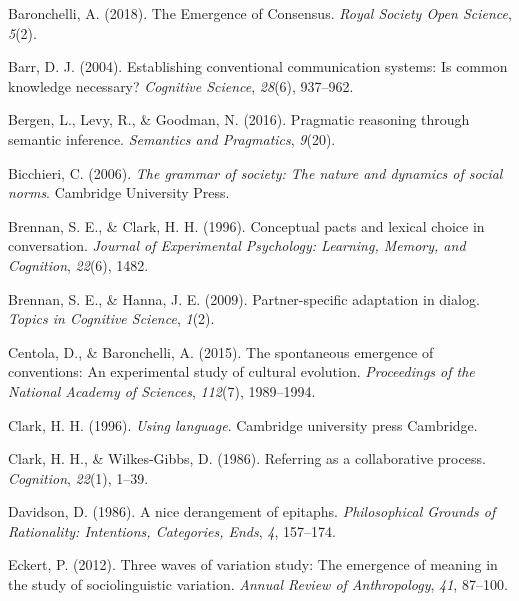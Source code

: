 \documentclass[10pt, letterpaper]{article}
\begin{document}
\setlength{\parindent}{-0.1in} 
\setlength{\leftskip}{0.125in}

\noindent

\hypertarget{refs}{}
\leavevmode\hypertarget{ref-baronchelli_emergence_2018}{}%
Baronchelli, A. (2018). The Emergence of Consensus. \emph{Royal Society
Open Science}, \emph{5}(2).

\leavevmode\hypertarget{ref-barr_establishing_2004}{}%
Barr, D. J. (2004). Establishing conventional communication systems: Is
common knowledge necessary? \emph{Cognitive Science}, \emph{28}(6),
937--962.

\leavevmode\hypertarget{ref-bergen_pragmatic_2016}{}%
Bergen, L., Levy, R., \& Goodman, N. (2016). Pragmatic reasoning through
semantic inference. \emph{Semantics and Pragmatics}, \emph{9}(20).

\leavevmode\hypertarget{ref-bicchieri_grammar_2006}{}%
Bicchieri, C. (2006). \emph{The grammar of society: The nature and
dynamics of social norms}. Cambridge University Press.

\leavevmode\hypertarget{ref-BrennanClark96_ConceptualPactsConversation}{}%
Brennan, S. E., \& Clark, H. H. (1996). Conceptual pacts and lexical
choice in conversation. \emph{Journal of Experimental Psychology:
Learning, Memory, and Cognition}, \emph{22}(6), 1482.

\leavevmode\hypertarget{ref-brennan_partner-specific_2009}{}%
Brennan, S. E., \& Hanna, J. E. (2009). Partner-specific adaptation in
dialog. \emph{Topics in Cognitive Science}, \emph{1}(2).

\leavevmode\hypertarget{ref-centola_spontaneous_2015}{}%
Centola, D., \& Baronchelli, A. (2015). The spontaneous emergence of
conventions: An experimental study of cultural evolution.
\emph{Proceedings of the National Academy of Sciences}, \emph{112}(7),
1989--1994.

\leavevmode\hypertarget{ref-clark_using_1996}{}%
Clark, H. H. (1996). \emph{Using language}. Cambridge university press
Cambridge.

\leavevmode\hypertarget{ref-clark_referring_1986}{}%
Clark, H. H., \& Wilkes-Gibbs, D. (1986). Referring as a collaborative
process. \emph{Cognition}, \emph{22}(1), 1--39.

\leavevmode\hypertarget{ref-davidson_nice_1986}{}%
Davidson, D. (1986). A nice derangement of epitaphs. \emph{Philosophical
Grounds of Rationality: Intentions, Categories, Ends}, \emph{4},
157--174.

\leavevmode\hypertarget{ref-eckert_three_2012}{}%
Eckert, P. (2012). Three waves of variation study: The emergence of
meaning in the study of sociolinguistic variation. \emph{Annual Review
of Anthropology}, \emph{41}, 87--100.
\end{document}

